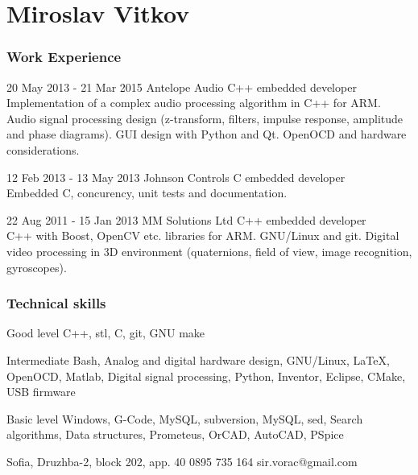 \documentclass{tccv}
\begin{document}
\part{Miroslav Vitkov}


\section{Work Experience}
\begin{eventlist}
\item{20 May 2013 - 21 Mar 2015}
     {Antelope Audio}
     {C++ embedded developer} \\
Implementation of a complex audio processing algorithm in C++ for ARM.
Audio signal processing design (z-transform, filters, impulse response, amplitude and phase diagrams).
GUI design with Python and Qt.
OpenOCD and hardware considerations.

\item{12 Feb 2013 - 13 May 2013}
     {Johnson Controls}
     {C embedded developer} \\
Embedded C, concurency, unit tests and documentation.

\item{22 Aug 2011 - 15 Jan 2013}
     {MM Solutions Ltd}
     {C++ embedded developer} \\
C++ with Boost, OpenCV etc. libraries for ARM.
GNU/Linux and git.
Digital video processing in 3D environment (quaternions, field of view, image recognition, gyroscopes).
\end{eventlist}


\section{Technical skills}
\begin{factlist}
\item{Good level}
     {C++, stl, C, git, GNU make}

\item{Intermediate}
     {Bash, Analog and digital hardware design, GNU/Linux, LaTeX, OpenOCD, Matlab, Digital signal processing, Python, Inventor, Eclipse, CMake, USB firmware}

\item{Basic level}
     {Windows, G-Code, MySQL, subversion, MySQL, sed, Search algorithms, Data structures, Prometeus, OrCAD, AutoCAD, PSpice}
\end{factlist}


\personal
    {Sofia, Druzhba-2, block 202, app. 40}
    {0895 735 164}
    {sir.vorac@gmail.com}
\end{document}

